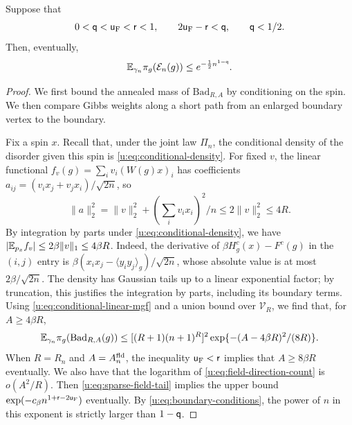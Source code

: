 \begin{lemma}\label{u:lem:boundary}
Suppose that
\begin{equation}\label{u:eq:boundary-conditions}
 0<\mathsf{q}<\mathsf{u}_{\rm F}<\mathsf{r}<1,\qquad
 2\mathsf{u}_{\rm F}-\mathsf{r}<\mathsf{q},\qquad \mathsf{q}<1/2.
\end{equation}
Then, eventually,
\begin{equation}\label{u:eq:annealed-boundary-mass}
 \mathbb E_{\gamma_n}\pi_g(\mathcal E_n(g))
                         \le e^{-\frac12 n^{1-\mathsf{q}}}.
\end{equation}
\end{lemma}

\begin{proof}
We first bound the annealed mass of $\mathrm{Bad}_{R,A}$ by conditioning
on the spin. We then compare Gibbs weights along a short path from an
enlarged boundary vertex to the boundary.

Fix a spin $x$. Recall that, under the joint law $\Pi_n$, the conditional
density of the disorder given this spin is
\eqref{u:eq:conditional-density}. For fixed $v$, the linear functional
$f_v(g)=\sum_i v_i(W(g)x)_i$ has coefficients
$a_{ij}=(v_ix_j+v_jx_i)/\sqrt{2n}$, so
\[
 \|a\|_2^2=\|v\|_2^2+(\textstyle\sum_i v_ix_i)^2/n
                         \le2\|v\|_2^2\le4R.
\]
By integration by parts under \eqref{u:eq:conditional-density}, we have
$|\mathbb E_{p_x}f_v|\le2\beta\|v\|_1\le4\beta R$. Indeed, the derivative of
$\beta H^c_g(x)-F^c(g)$ in the $(i,j)$ entry is
$\beta(x_ix_j-\langle y_iy_j\rangle_g)/\sqrt{2n}$, whose absolute value
is at most $2\beta/\sqrt{2n}$. The density has Gaussian tails up to a linear exponential factor; by
truncation, this justifies the integration by parts, including its
boundary terms. Using
\eqref{u:eq:conditional-linear-mgf} and a union bound over
$\mathcal V_R$, we find that, for $A\ge4\beta R$,
\begin{equation}\label{u:eq:sparse-field-tail}
 \mathbb E_{\gamma_n}\pi_g(\mathrm{Bad}_{R,A}(g))
 \le[(R+1)(n+1)^R]^2
                    \exp\{-(A-4\beta R)^2/(8R)\}.
\end{equation}
When $R=R_n$ and $A=A_n^{\rm fld}$, the inequality
$\mathsf{u}_{\rm F}<\mathsf{r}$ implies that $A\ge8\beta R$ eventually. We also
have that the logarithm of \eqref{u:eq:field-direction-count} is $o(A^2/R)$.
Then \eqref{u:eq:sparse-field-tail} implies the upper bound
$\exp(-c_\beta n^{1+\mathsf{r}-2\mathsf{u}_{\rm F}})$ eventually.
By \eqref{u:eq:boundary-conditions}, the power of $n$ in this exponent is
strictly larger than $1-\mathsf{q}$.


\end{proof}
